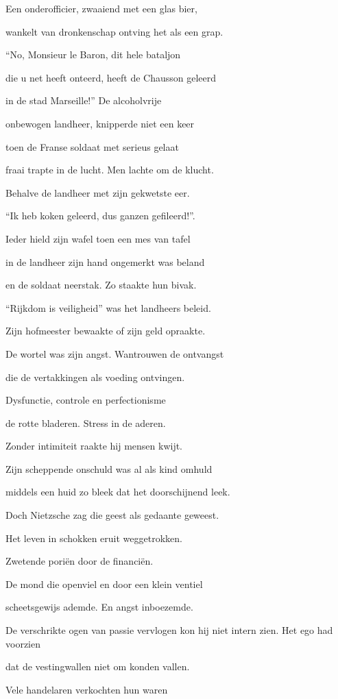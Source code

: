 Een onderofficier,
zwaaiend met een glas bier,

wankelt van dronkenschap
ontving het als een grap.

“No, Monsieur le Baron,
dit hele bataljon

die u net heeft onteerd,
heeft de Chausson geleerd

in de stad Marseille!”
De alcoholvrije

onbewogen landheer,
knipperde niet een keer

toen de Franse soldaat
met serieus gelaat

fraai trapte in de lucht.
Men lachte om de klucht.

Behalve de landheer
met zijn gekwetste eer.

“Ik heb koken geleerd,
dus ganzen gefileerd!”.

Ieder hield zijn wafel
toen een mes van tafel

in de landheer zijn hand
ongemerkt was beland

en de soldaat neerstak.
Zo staakte hun bivak.

“Rijkdom is veiligheid”
was het landheers beleid.

Zijn hofmeester bewaakte
of zijn geld opraakte.

De wortel was zijn angst.
Wantrouwen de ontvangst

die de vertakkingen
als voeding ontvingen.

Dysfunctie, controle
en perfectionisme

de rotte bladeren.
Stress in de aderen.

Zonder intimiteit
raakte hij mensen kwijt.

Zijn scheppende onschuld
was al als kind omhuld

middels een huid zo bleek
dat het doorschijnend leek.

Doch Nietzsche zag die geest
als gedaante geweest.

Het leven in schokken
eruit weggetrokken.

Zwetende poriën
door de financiën.

De mond die openviel
en door een klein ventiel

scheetsgewijs ademde.
En angst inboezemde.

De verschrikte ogen
van passie vervlogen
kon hij niet intern zien.
Het ego had voorzien

dat de vestingwallen
niet om konden vallen.

Vele handelaren
verkochten hun waren

